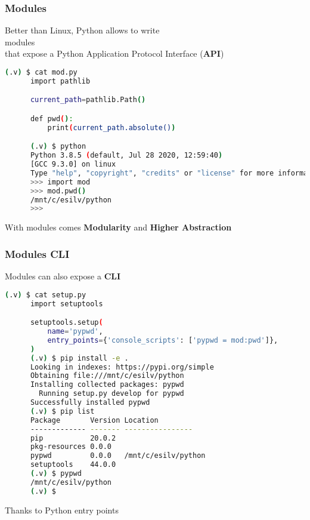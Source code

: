 \begin{frame}[fragile]\frametitle{Modules}
   \centering
   Better than Linux,
   Python allows to write \\ [2ex]
   \Huge modules \normalsize \\
   that expose a Python Application Protocol Interface (\textbf{API}) \\ [2ex]
   \begin{lstlisting}[language=bash, style=bash, autogobble]
      (.v) $ cat mod.py
      import pathlib

      current_path=pathlib.Path()

      def pwd():
          print(current_path.absolute())

      (.v) $ python
      Python 3.8.5 (default, Jul 28 2020, 12:59:40)
      [GCC 9.3.0] on linux
      Type "help", "copyright", "credits" or "license" for more information.
      >>> import mod
      >>> mod.pwd()
      /mnt/c/esilv/python
      >>>
   \end{lstlisting}
   \vspace{1ex}
   \begin{center}
      With modules comes \textbf{Modularity} and \textbf{Higher Abstraction}
   \end{center}
\end{frame}

\begin{frame}[fragile]\frametitle{Modules CLI}
   \centering
   Modules can also expose a \textbf{CLI} \\ [1ex]
   \begin{lstlisting}[language=bash, style=bash, autogobble]
      (.v) $ cat setup.py
      import setuptools

      setuptools.setup(
          name='pypwd',
          entry_points={'console_scripts': ['pypwd = mod:pwd']},
      )
      (.v) $ pip install -e .
      Looking in indexes: https://pypi.org/simple
      Obtaining file:///mnt/c/esilv/python
      Installing collected packages: pypwd
        Running setup.py develop for pypwd
      Successfully installed pypwd
      (.v) $ pip list
      Package       Version Location
      ------------- ------- ----------------
      pip           20.0.2
      pkg-resources 0.0.0
      pypwd         0.0.0   /mnt/c/esilv/python
      setuptools    44.0.0
      (.v) $ pypwd
      /mnt/c/esilv/python
      (.v) $
   \end{lstlisting}
   \vspace{1ex}
   \begin{center}
      Thanks to Python entry points
   \end{center}
\end{frame}

